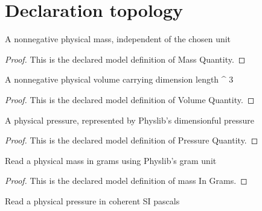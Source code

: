 \section{Declaration topology}
\begin{definition}
  \label{def:physics:phyx-mini-0371:phyxminiproblems-problemphyxmini0371-massquantity}
  A nonnegative physical mass, independent of the chosen unit
\end{definition}
\begin{proof}
  This is the declared model definition of Mass Quantity.
\end{proof}
\begin{definition}
  \label{def:physics:phyx-mini-0371:phyxminiproblems-problemphyxmini0371-volumequantity}
  A nonnegative physical volume carrying dimension length \textasciicircum{} 3
\end{definition}
\begin{proof}
  This is the declared model definition of Volume Quantity.
\end{proof}
\begin{definition}
  \label{def:physics:phyx-mini-0371:phyxminiproblems-problemphyxmini0371-pressurequantity}
  A physical pressure, represented by Physlib's dimensionful pressure
\end{definition}
\begin{proof}
  This is the declared model definition of Pressure Quantity.
\end{proof}
\begin{definition}
  \label{def:physics:phyx-mini-0371:phyxminiproblems-problemphyxmini0371-massingrams}
  Read a physical mass in grams using Physlib's gram unit
\end{definition}
\begin{proof}
  This is the declared model definition of mass In Grams.
\end{proof}
\begin{definition}
  \label{def:physics:phyx-mini-0371:phyxminiproblems-problemphyxmini0371-pressureinpascals}
  Read a physical pressure in coherent SI pascals
\end{definition}
